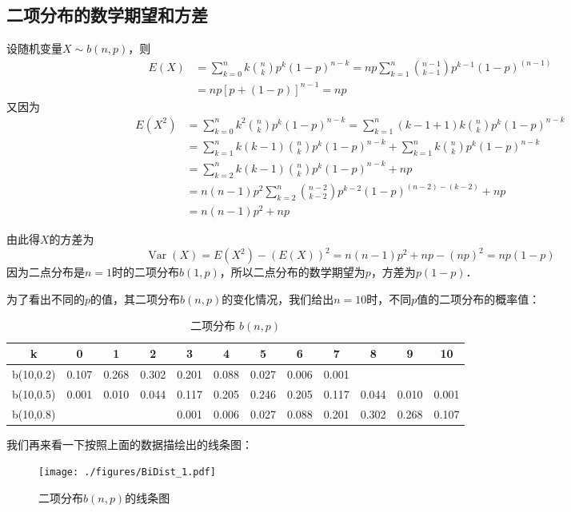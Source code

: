 \subsection{二项分布的数学期望和方差}

设随机变量$X\sim b(n,p)$，则
\begin{equation}
\begin{aligned} E(X) &=\sum_{k=0}^{n} k\binom{n}{k} p^{k}(1-p)^{n-k}=n p \sum_{k=1}^{n}\binom{n-1}{k-1} p^{k-1}(1-p)^{(n-1)} \\ &=n p[p+(1-p)]^{n-1}=n p \end{aligned}
\end{equation}
又因为
\begin{equation}
\begin{aligned} E\left(X^{2}\right) &=\sum_{k=0}^{n} k^{2}\binom{n}{k} p^{k}(1-p)^{n-k}=\sum_{k=1}^{n}(k-1+1) k\binom{n}{k} p^{k}(1-p)^{n-k} \\ &=\sum_{k=1}^{n} k(k-1)\binom{n}{k} p^{k}(1-p)^{n-k}+\sum_{k=1}^{n} k\binom{n}{k} p^{k}(1-p)^{n-k} \\ &=\sum_{k=2}^{n} k(k-1)\binom{n}{k} p^{k}(1-p)^{n-k}+n p \\ &=n(n-1) p^{2} \sum_{k=2}^{n}\binom{n-2}{k-2} p^{k-2}(1-p)^{(n-2)-(k-2)}+n p \\ &=n(n-1) p^{2}+n p \end{aligned}
\end{equation}

由此得$X $的方差为
\begin{equation}
\operatorname{Var}(X)=E\left(X^{2}\right)-(E(X))^{2}=n(n-1) p^{2}+n p-(n p)^{2}=n p(1-p)
\end{equation}
因为二点分布是$n=1$时的二项分布$b(1,p)$，所以二点分布的数学期望为$p$，方差为$p(1-p)$．

为了看出不同的$p $的值，其二项分布$b(n ,p) $的变化情况，我们给出$n=10$时，不同$p $值的二项分布的概率值：
\begin{table}[ht]
\centering
\caption{二项分布 $b(n, p)$}\label{BiDist_tab1}
\begin{tabular}{|c|c|c|c|c|c|c|c|c|c|c|c|}
\hline
k & 0 & 1 & 2 & 3 & 4 & 5 & 6 & 7 & 8 & 9 & 10 \\
\hline
b(10,0.2) & 0.107 & 0.268 & 0.302 & 0.201 & 0.088 & 0.027 & 0.006 & 0.001 & & & \\
\hline
b(10,0.5) & 0.001 & 0.010 & 0.044 & 0.117 & 0.205 & 0.246 & 0.205 & 0.117 & 0.044 & 0.010 & 0.001 \\
\hline
b(10,0.8) & & & & 0.001 & 0.006 & 0.027 & 0.088 & 0.201 & 0.302 & 0.268 & 0.107 \\
\hline
\end{tabular}
\end{table}
我们再来看一下按照上面的数据描绘出的线条图：
\begin{figure}[ht]
\centering
\texttt{[image: ./figures/BiDist\_1.pdf]}
\caption{二项分布$b(n,p)$的线条图} \label{BiDist_fig1}
\end{figure}


